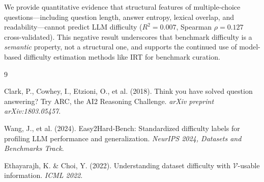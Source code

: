 \documentclass[11pt,a4paper]{article}
\begin{document}
We provide quantitative evidence that structural features of multiple-choice questions---including question length, answer entropy, lexical overlap, and readability---cannot predict LLM difficulty ($R^2 = 0.007$, Spearman $\rho = 0.127$ cross-validated). This negative result underscores that benchmark difficulty is a \emph{semantic} property, not a structural one, and supports the continued use of model-based difficulty estimation methods like IRT for benchmark curation.


\begin{thebibliography}{9}

Clark, P., Cowhey, I., Etzioni, O., et al. (2018).
\newblock Think you have solved question answering? Try ARC, the AI2 Reasoning Challenge.
\newblock \emph{arXiv preprint arXiv:1803.05457}.

Wang, J., et al. (2024).
\newblock Easy2Hard-Bench: Standardized difficulty labels for profiling LLM performance and generalization.
\newblock \emph{NeurIPS 2024, Datasets and Benchmarks Track}.

Ethayarajh, K. \& Choi, Y. (2022).
\newblock Understanding dataset difficulty with $\mathcal{V}$-usable information.
\newblock \emph{ICML 2022}.

\end{thebibliography}
\end{document}

